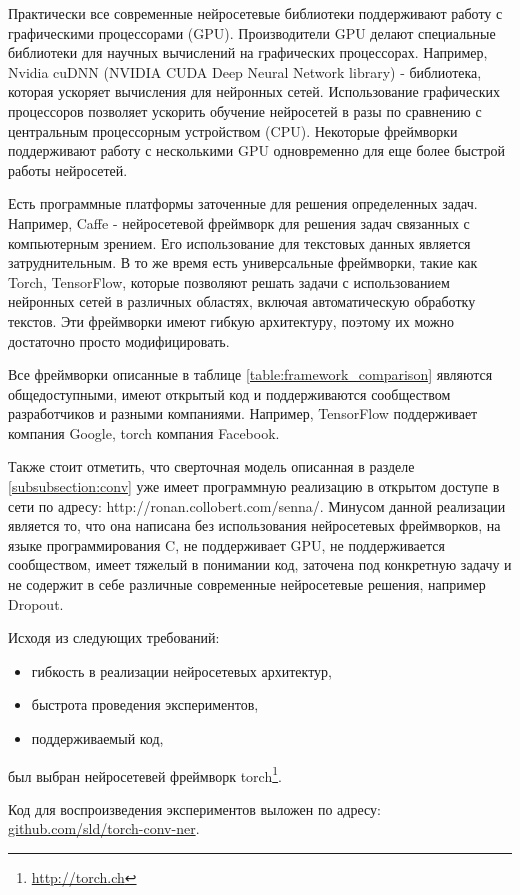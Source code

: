 Практически все современные нейросетевые библиотеки поддерживают работу
с графическими процессорами (GPU).
Производители GPU делают специальные библиотеки для научных
вычислений на графических процессорах.
Например, Nvidia cuDNN (NVIDIA CUDA Deep Neural Network library) -
библиотека, которая ускоряет вычисления для нейронных сетей.
Использование графических процессоров позволяет ускорить обучение нейросетей
в разы по сравнению с центральным процессорным устройством (CPU).
Некоторые фреймворки поддерживают работу с несколькими GPU одновременно для
еще более быстрой работы нейросетей.

Есть программные платформы заточенные для решения определенных задач.
Например, Caffe - нейросетевой фреймворк для решения задач связанных с компьютерным зрением.
Его использование для текстовых данных является затруднительным.
В то же время есть универсальные фреймворки, такие как Torch, TensorFlow,
которые позволяют решать задачи с использованием нейронных сетей в различных
областях, включая автоматическую обработку текстов.
Эти фреймворки имеют гибкую архитектуру, поэтому их можно достаточно просто модифицировать.

Все фреймворки описанные в таблице \ref{table:framework_comparison} являются
общедоступными, имеют открытый код и поддерживаются сообществом разработчиков и
разными компаниями. Например, TensorFlow поддерживает компания Google, torch
компания Facebook.

Также стоит отметить, что сверточная модель описанная в разделе \ref{subsubsection:conv}
уже имеет программную реализацию в открытом доступе в сети по адресу: http://ronan.collobert.com/senna/.
Минусом данной реализации является то, что она написана без использования
нейросетевых фреймворков, на языке программирования C, не поддерживает GPU,
не поддерживается сообществом, имеет тяжелый в понимании код, заточена под конкретную задачу
и не содержит в себе различные современные нейросетевые решения, например Dropout.

Исходя из следующих требований:
\begin{itemize}
\item гибкость в реализации нейросетевых архитектур,
\item быстрота проведения экспериментов,
\item поддерживаемый код,
\end{itemize}
был выбран нейросетевей фреймворк torch\footnote{\url{http://torch.ch}}.

Код для воспроизведения экспериментов выложен по адресу:
\href{https://github.com/sld/torch-conv-ner}{github.com/sld/torch-conv-ner}.

